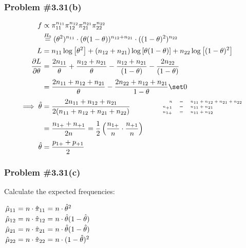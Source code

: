 \documentclass[12pt, letterpaper]{article}
\begin{document}
\subsubsection*{Problem {\#}3.31(b)} 
\begin{align*}
f & \propto \pi_{11}^{n_{11}} \pi_{12}^{n_{12}} \pi_{21}^{n_{21}} \pi_{22}^{n_{22}}
\\
& \stackrel{H_0}{=} (\theta^2)^{n_{11}} \cdot (\theta(1 - \theta))^{n_{12}+n_{21}} \cdot ((1 - \theta)^2)^{n_{22}}
\\
L & =  n_{11} \log\left[ \theta^2 \right] + (n_{12} + n_{21}) \log \left[ \theta(1 - \theta) \right] + n_{22} \log \left[ (1 - \theta)^2 \right] 
\\
\frac{ \partial L}{ \partial \theta} & = \frac{2 n_{11}}{\theta} + \frac{n_{12} + n_{21}}{\theta} - \frac{n_{12} + n_{21}}{(1 - \theta)} - \frac{ 2 n_{22} }{(1 - \theta) }
\\[0.5ex]
& = \frac{ 2 n_{11} + n_{12} + n_{21}}{\theta} - \frac{2 n_{22} + n_{12} + n_{21}}{1 - \theta} \set 0 
\\[0.5ex]
\implies \hat{\theta} & = \frac{ 2 n_{11} + n_{12} + n_{21} }{2(n_{11} + n_{12} + n_{21} + n_{22}  )} 
\qquad \qquad  \begin{tiny}
\begin{array}{r c l}
n &=& n_{11} + n_{12} + n_{21} + n_{22} \\
n_{+1} &=&  n_{11} + n_{21} \\
n_{1+} &=& n_{11} + n_{12}
\end{array}
\end{tiny}
\\[1ex]
& = \frac{ n_{1+} + n_{+1} }{2 n} = \frac{1}{2} \left( \frac{n_{1+}}{n} \cdot \frac{n_{+1}}{n} \right)  
\\[0.5ex]
\hat{\theta} &= \frac{ p_{1+} + p_{+1} }{2}
\end{align*}

\subsubsection*{Problem {\#}3.31(c)}

Calculate the expected frequencies: 

$
\arraycolsep=1.5pt \def\arraystretch{1.2}
\begin{array}{r c l c l}
\hat{\mu}_{11} & = & n \cdot \hat{\pi}_{11} &=& n \cdot \hat{\theta}^2 \\
\hat{\mu}_{12} & = &n \cdot \hat{\pi}_{12} &=& n \cdot \hat{\theta}(1 - \hat{\theta}) \\ 
\hat{\mu}_{21} & = &n \cdot \hat{\pi}_{21} &=& n \cdot \hat{\theta}(1 - \hat{\theta}) \\
\hat{\mu}_{22} & = &n \cdot \hat{\pi}_{22} &=& n \cdot (1 - \hat{\theta})^2
\end{array}$ 
\end{document}
